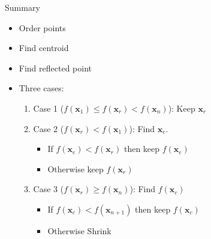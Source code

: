 \documentclass[10pt]{beamer}
\begin{document}
\begin{frame}{Summary}
  \begin{itemize}
  \item Order points
  \item Find centroid
  \item Find reflected point
  \item Three cases:
    \begin{enumerate}
    \item Case 1 ($f({\bm x_1})\leq f({\bm x_r})<f({\bm x_n})$): Keep ${\bm x_r}$
    \item Case 2 ($f({\bm x_r}) < f({\bm x_1})$): Find ${\bm x_e}$.
      \begin{itemize}
      \item If $f({\bm x_e})<f({\bm x_r})$ then keep $f({\bm x_e})$
      \item Otherwise keep $f({\bm x_r})$
      \end{itemize}
    \item Case 3 ($f({\bm x_r})\geq f({\bm x_n})$): Find $f({\bm x_c})$
      \begin{itemize}
      \item If $f({\bm x_c})<f({\bm x_{n+1}})$ then keep $f({\bm x_{c}})$
      \item Otherwise Shrink
      \end{itemize}
    \end{enumerate}
  \end{itemize}
\end{frame}
\end{document}
